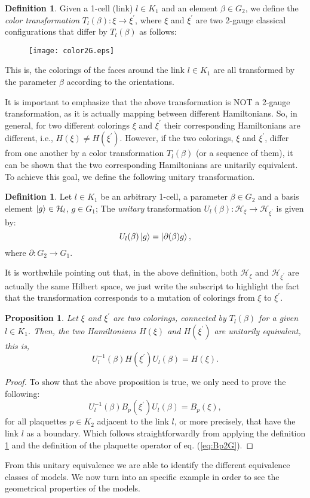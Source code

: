 \documentclass[titlepage,11pt]{article}
\theoremstyle{plain}%
\newtheorem{prop}[thm]{Proposition}
\theoremstyle{definition}
\newtheorem{defn}[thm]{Definition}
\theoremstyle{remark}
\begin{document}
\begin{defn}\label{def:coltrans}
Given a 1-cell (link) $l \in K_1$ and an element $\beta \in G_2$, we define the \emph{color transformation} $T_l(\beta):\xi \rightarrow \xi^{\prime}$, where $\xi$ and $\xi^{\prime}$ are two 2-gauge classical configurations that differ by $T_l(\beta)$ as follows:

\begin{figure}[h!]
\centering
\texttt{[image: color2G.eps]}
\label{fig:coltrans}
\end{figure}

This is, the colorings of the faces around the link $l \in K_1$ are all transformed by the parameter $\beta$ according to the orientations. 
\end{defn}
It is important to emphasize that the above transformation is NOT a 2-gauge transformation, as it is actually mapping between different Hamiltonians. So, in general, for two different colorings $\xi$ and $\xi^{\prime}$ their corresponding Hamiltonians are different, i.e., $H(\xi)\neq H(\xi^{\prime})$. However, if the two colorings, $\xi$ and $\xi^{\prime}$, differ from one another by a color transformation $T_l(\beta)$ (or a sequence of them), it can be shown that the two corresponding Hamiltonians are unitarily equivalent. To achieve this goal, we define the following unitary transformation.
\begin{defn}\label{def:unitrans} Let $l \in K_1$ be an arbitrary 1-cell, a parameter $\beta \in G_2$ and a basis element $\ket{g}\in \mathcal{H}_l$, $g \in G_1$; The \emph{unitary} transformation $U_l(\beta):\mathcal{H}_\xi \rightarrow \mathcal{H}_{\xi^{\prime}}$ is given by:
\[U_l(\beta)\ket{g}=\ket{\partial(\beta)g},\]
where $\partial:G_2 \rightarrow G_1$.
\end{defn}

It is worthwhile pointing out that, in the above definition, both $\mathcal{H}_\xi$ and $\mathcal{H}_{\xi^{\prime}}$ are actually the same Hilbert space, we just write the subscript to highlight the fact that the transformation corresponds to a mutation of colorings from $\xi$ to $\xi^{\prime}$. 
\begin{prop} Let $\xi$ and $\xi^{\prime}$ are two colorings, connected by $T_l(\beta)$ for a given $l \in K_1$. Then, the two Hamiltonians $H(\xi)$ and $H(\xi^{\prime})$ are unitarily equivalent, this is,
\[U_l^{-1}(\beta)H(\xi^{\prime})U_l(\beta) = H(\xi).\]
\end{prop}
\begin{proof}
To show that the above proposition is true, we only need to prove the following:
\[U_l^{-1}(\beta)B_p(\xi^{\prime})U_l(\beta) = B_p(\xi),\]
for all plaquettes $p \in K_2$ adjacent to the link $l$, or more precisely, that have the link $l$ as a boundary. Which follows straightforwardly from applying the definition \ref{def:unitrans} and the definition of the plaquette operator of eq. (\ref{eq:Bp2G}).
\end{proof}
From this unitary equivalence we are able to identify the different equivalence classes of models.
We now turn into an specific example in order to see the geometrical properties of the models. 
\end{document}
